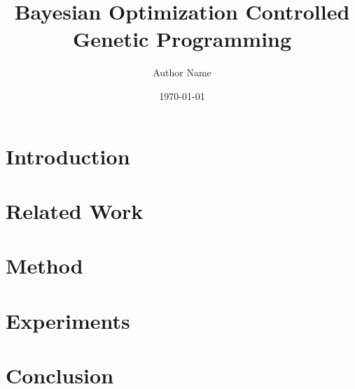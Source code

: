 \documentclass[11pt,a4paper]{article}
\title{Bayesian Optimization Controlled Genetic Programming}
\author{Author Name}
\date{\today}
\begin{document}
\maketitle

\begin{abstract}

\end{abstract}

\section{Introduction}


\section{Related Work}


\section{Method}


\section{Experiments}


\section{Conclusion}




\end{document}
